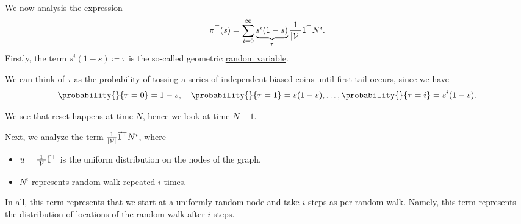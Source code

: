 We now analysis the expression
\[
	\pi^{\top}(s) = \sum\limits_{i=0}^{\infty} \underbrace{s^i (1 - s)}_{\tau}\frac{1}{\left\vert \mathcal{\MakeUppercase{v}}  \right\vert}\vec{1}^{\top}N^i.
\]
Firstly, the term \(s^i(1-s) \coloneqq \tau\) is the so-called geometric \hyperref[def:random-variable]{random variable}.
\begin{intuition}\label{int:geometric-random-variable}
	We can think of \(\tau\) as the probability of tossing a series of \hyperref[def:independent]{independent} biased coins until first tail occurs,
	since we have
	\[
		\probability{}{\tau = 0} = 1 - s,\quad
		\probability{}{\tau = 1} = s(1 - s), \ldots,
		\probability{}{\tau = i} = s^i(1 - s).
	\]
\end{intuition}
\begin{remark}
	We see that reset happens at time \(N\), hence we look at time \(N-1\).
\end{remark}

Next, we analyze the term \(\frac{1}{\left\vert \mathcal{\MakeUppercase{v}}  \right\vert}\vec{1}^{\top}N^i\), where
\begin{itemize}
	\item \(u = \frac{1}{\left\vert \mathcal{\MakeUppercase{v}}  \right\vert}\vec{1}^{\top}\) is the uniform distribution on the nodes of the graph.
	\item \(N^i\) represents random walk repeated \(i\) times.
\end{itemize}

\begin{intuition}
	In all, this term represents that we start at a uniformly random node and take \(i\) steps as per random walk. Namely,
	this term represents the distribution of locations of the random walk after \(i\) steps.
\end{intuition}


